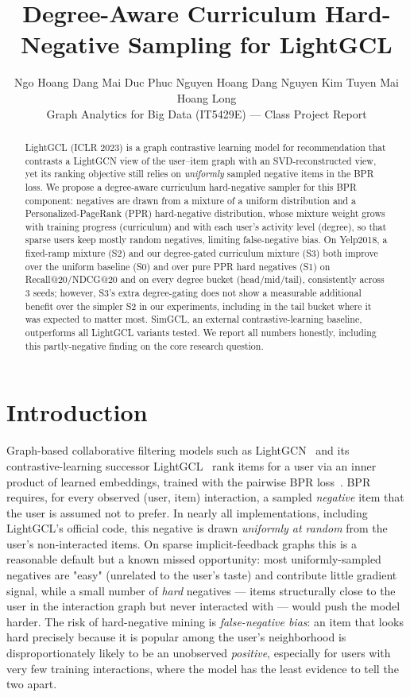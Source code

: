 \documentclass{article}
\title{Degree-Aware Curriculum Hard-Negative Sampling for LightGCL}
\author{
  Ngo Hoang Dang \quad Mai Duc Phuc \quad Nguyen Hoang Dang \quad Nguyen Kim Tuyen \quad Mai Hoang Long\\
  Graph Analytics for Big Data (IT5429E) --- Class Project Report
}
\begin{document}
\maketitle

\begin{abstract}
LightGCL (ICLR 2023) is a graph contrastive learning model for recommendation that
contrasts a LightGCN view of the user--item graph with an SVD-reconstructed view, yet its
ranking objective still relies on \emph{uniformly} sampled negative items in the BPR loss.
We propose a degree-aware curriculum hard-negative sampler for this BPR component:
negatives are drawn from a mixture of a uniform distribution and a Personalized-PageRank
(PPR) hard-negative distribution, whose mixture weight grows with training progress
(curriculum) and with each user's activity level (degree), so that sparse users keep
mostly random negatives, limiting false-negative bias. On Yelp2018, a fixed-ramp mixture
(S2) and our degree-gated curriculum mixture (S3) both improve over the uniform baseline
(S0) and over pure PPR hard negatives (S1) on Recall@20/NDCG@20 and on every degree
bucket (head/mid/tail), consistently across 3 seeds; however, S3's extra degree-gating
does not show a measurable additional benefit over the simpler S2 in our experiments,
including in the tail bucket where it was expected to matter most. SimGCL, an external
contrastive-learning baseline, outperforms all LightGCL variants tested. We report all
numbers honestly, including this partly-negative finding on the core research question.
\end{abstract}

\section{Introduction}

Graph-based collaborative filtering models such as LightGCN~\cite{lightgcn} and its
contrastive-learning successor LightGCL~\cite{lightgcl} rank items for a user via an
inner product of learned embeddings, trained with the pairwise BPR loss~\cite{bpr}. BPR
requires, for every observed (user, item) interaction, a sampled \emph{negative} item
that the user is assumed not to prefer. In nearly all implementations, including
LightGCL's official code, this negative is drawn \emph{uniformly at random} from the
user's non-interacted items. On sparse implicit-feedback graphs this is a reasonable
default but a known missed opportunity: most uniformly-sampled negatives are "easy"
(unrelated to the user's taste) and contribute little gradient signal, while a small
number of \emph{hard} negatives --- items structurally close to the user in the
interaction graph but never interacted with --- would push the model harder. The risk of
hard-negative mining is \emph{false-negative bias}: an item that looks hard precisely
because it is popular among the user's neighborhood is disproportionately likely to be an
unobserved \emph{positive}, especially for users with very few training interactions,
where the model has the least evidence to tell the two apart.
\end{document}
